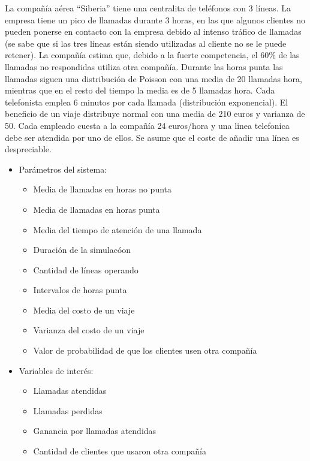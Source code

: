 \documentclass{article}
\begin{document}
	La compañía aérea “Siberia” tiene una centralita de teléfonos con 3 líneas. La empresa tiene un pico de llamadas durante 3 horas, en las que algunos clientes no pueden ponerse en contacto con la empresa debido al intenso tráfico de llamadas (se sabe que si las tres líneas están siendo utilizadas al cliente no se le puede retener). La compañía estima que, debido a la fuerte competencia, el 60\% de las	llamadas no respondidas utiliza otra compañía. Durante las horas punta las llamadas siguen una distribución de Poisson con una media de 20 llamadas hora, mientras que en el resto del tiempo la media es de 5 llamadas hora. Cada telefonista emplea 6 minutos por cada llamada (distribución exponencial). El beneficio de un viaje distribuye normal con una media de  210 euros y varianza de 50. Cada empleado cuesta a la compañía 24 euros/hora y una linea telefonica debe ser atendida por uno de ellos. Se asume que el coste de añadir una línea es despreciable.
	
	\begin{itemize}
		
		\item Parámetros del sistema:
		\begin{itemize}[left=2em]
			\item Media de llamadas en horas no punta
			\item Media de llamadas en horas punta
			\item Media del tiempo de atención de una llamada
			\item Duración de la simulacóon
			\item Cantidad de líneas operando
			\item Intervalos de horas punta
			\item Media del costo de un viaje
			\item Varianza del costo de un viaje
			\item Valor de probabilidad de que los clientes usen otra compañía
		\end{itemize}
		
		\item Variables de interés:
		\begin{itemize}[left=2em]
			\item Llamadas atendidas
			\item Llamadas perdidas
			\item Ganancia por llamadas atendidas
			\item Cantidad de clientes que usaron otra compañía
		\end{itemize}
	\end{itemize}
	
\end{document}
